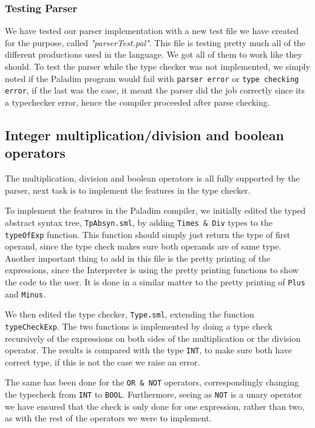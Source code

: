 \documentclass[10pt]{article}
\begin{document}
\subsubsection{Testing Parser}
We have tested our parser implementation with a new test file we have created for the purpose, called \textit{"parserTest.pal"}. This file is testing pretty much all of the different productions used in the language. We got all of them to work like they should. To test the parser while the type checker was not implemented, we simply noted if the Paladim program would fail with \texttt{parser error} or \texttt{type checking error}, if the last was the case, it meant the parser did the job correctly since its a typechecker error, hence the compiler proceeded after parse checking.

\subsection{Integer multiplication/division and boolean operators}
The multiplication, division and boolean operators is all fully supported by the parser, next task is to implement the features in the type checker.

To implement the features in the Paladim compiler, we initially edited the typed abstract syntax tree, \texttt{TpAbsyn.sml}, by adding \texttt{Times \& Div} types to the \texttt{typeOfExp} function. This function should simply just return the type of first operand, since the type check makes sure both operands are of same type. Another important thing to add in this file is the pretty printing of the expressions, since the Interpreter is using the pretty printing functions to show the code to the user. It is done in a similar matter to the pretty printing of \texttt{Plus} and \texttt{Minus}.

We then edited the type checker, \texttt{Type.sml}, extending the function \texttt{typeCheckExp}. The two functions is implemented by doing a type check recursively of the expressions on both sides of the multiplication or the division operator. The results is compared with the type \texttt{INT}, to make sure both have correct type, if this is not the case we raise an error.

The same has been done for the \texttt{OR \& NOT} operators, correspondingly changing the typecheck from \texttt{INT} to \texttt{BOOL}. Furthermore, seeing as \texttt{NOT} is a unary operator we have ensured that the check is only done for one expression, rather than two, as with the rest of the operators we were to implement.
\end{document}
